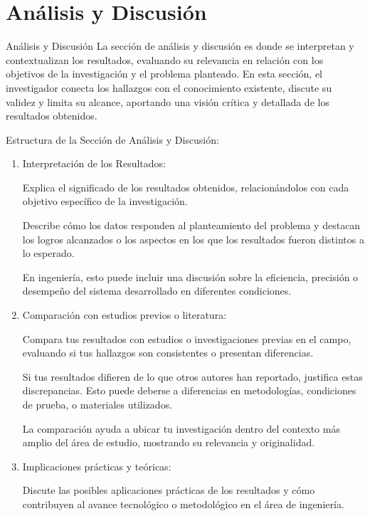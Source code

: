 \documentclass[9pt]{beamer}
\begin{document}
\section{Análisis y Discusión}
\begin{frame}{Análisis y Discusión}
La sección de análisis y discusión es donde se interpretan y contextualizan los resultados, evaluando su relevancia en relación con los objetivos de la investigación y el problema planteado. En esta sección, el investigador conecta los hallazgos con el conocimiento existente, discute su validez y limita su alcance, aportando una visión crítica y detallada de los resultados obtenidos.

Estructura de la Sección de Análisis y Discusión:

\begin{enumerate}
    \item Interpretación de los Resultados:

    Explica el significado de los resultados obtenidos, relacionándolos con cada objetivo específico de la investigación.

    Describe cómo los datos responden al planteamiento del problema y destacan los logros alcanzados o los aspectos en los que los resultados fueron distintos a lo esperado.

    En ingeniería, esto puede incluir una discusión sobre la eficiencia, precisión o desempeño del sistema desarrollado en diferentes condiciones.

    \item Comparación con estudios previos o literatura:

    Compara tus resultados con estudios o investigaciones previas en el campo, evaluando si tus hallazgos son consistentes o presentan diferencias.

    Si tus resultados difieren de lo que otros autores han reportado, justifica estas discrepancias. Esto puede deberse a diferencias en metodologías, condiciones de prueba, o materiales utilizados.

    La comparación ayuda a ubicar tu investigación dentro del contexto más amplio del área de estudio, mostrando su relevancia y originalidad.

    \item Implicaciones prácticas y teóricas:

    Discute las posibles aplicaciones prácticas de los resultados y cómo contribuyen al avance tecnológico o metodológico en el área de ingeniería.


\end{enumerate}
\end{frame}
\end{document}
